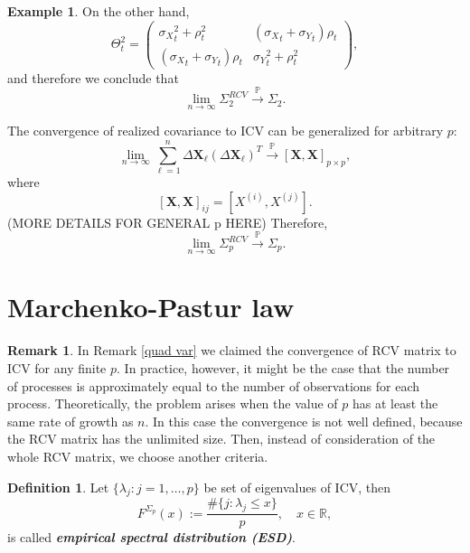\documentclass[a4paper,11pt]{article}
\theoremstyle{plain}
\theoremstyle{definition}
\newtheorem{defn}[thm]{Definition}
\newtheorem{exmp}[thm]{Example}
\newtheorem{rmrk}[thm]{Remark}
\newcommand{\MR}{\mathbb{R}}
\newcommand{\define}[1]{\textit{\textbf{#1}}}
\begin{document}
\begin{exmp}
		On the other hand,
		\[ \Theta_t^2 = \begin{pmatrix}
		{\sigma_X}_t^2 + \rho_t^2 & ({\sigma_X}_t + {\sigma_Y}_t)\rho_t \\
		({\sigma_X}_t + {\sigma_Y}_t)\rho_t  & {\sigma_Y}_t^2 + \rho_t^2
		\end{pmatrix}, \]
		and therefore we conclude that
		\[ \lim_{n \rightarrow \infty} \Sigma_2^{RCV} \xrightarrow{\mathbb{P}} \Sigma_2. \]
		
		The convergence of realized covariance to ICV  can be generalized for arbitrary $p$:
		\[  \lim_{n \rightarrow \infty} \sum_{\ell=1}^{n}\Delta \mathbf{X}_\ell(\Delta \mathbf{X}_\ell)^T \xrightarrow{\mathbb{P}} [\mathbf{X}, \mathbf{X}]_{p \times p}, \]
		where 
		\[[\mathbf{X}, \mathbf{X}]_{ij} = [X^{(i)}, X^{(j)}].\]
		(MORE DETAILS FOR GENERAL p HERE)
		Therefore,
		\[ \lim_{n \rightarrow \infty} \Sigma_p^{RCV} \xrightarrow{\mathbb{P}} \Sigma_p. \]
	\end{exmp}
	
	\pagebreak
	\part{Marchenko-Pastur law}
	\begin{rmrk}
		In Remark \ref{quad var} we claimed the convergence of RCV matrix to ICV for any finite $p$. In practice, however, it might be the case that the number of processes is approximately equal to the number of observations for each process. Theoretically, the problem arises when the value of $p$ has at least the same rate of growth as $n$. In this case the convergence is not well defined, because the RCV matrix has the unlimited size. Then, instead of consideration of the whole RCV matrix, we choose another criteria.
	\end{rmrk}
	
	\begin{defn}
		Let $\{\lambda_j:j=1,\dots, p\}$ be set of eigenvalues of ICV, then
		\[F^{\Sigma_p}(x) := \frac{\#\{j:\lambda_j \leq x\}}{p}, \quad x \in \MR, \]
		is called \define{empirical spectral distribution (ESD)}.
	\end{defn}
	
\end{document}
